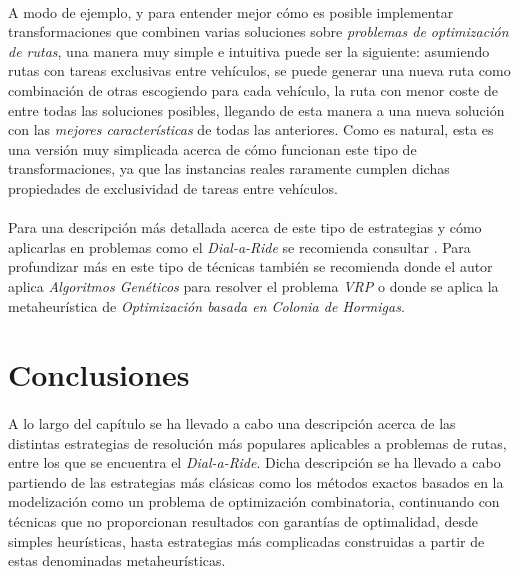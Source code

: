 \documentclass{subfiles}
\begin{document}
      \paragraph{}
      A modo de ejemplo, y para entender mejor cómo es posible implementar transformaciones que combinen varias soluciones sobre \emph{problemas de optimización de rutas}, una manera muy simple e intuitiva puede ser la siguiente: asumiendo rutas con tareas exclusivas entre vehículos, se puede generar una nueva ruta como combinación de otras escogiendo para cada vehículo, la ruta con menor coste de entre todas las soluciones posibles, llegando de esta manera a una nueva solución con las \emph{mejores características} de todas las anteriores. Como es natural, esta es una versión muy simplicada acerca de cómo funcionan este tipo de transformaciones, ya que las instancias reales raramente cumplen dichas propiedades de exclusividad de tareas entre vehículos.

      \paragraph{}
      Para una descripción más detallada acerca de este tipo de estrategias y cómo aplicarlas en problemas como el \emph{Dial-a-Ride} se recomienda consultar \cite{jorgensen2007solving}. Para profundizar más en este tipo de técnicas también se recomienda \cite{baker2003genetic} donde el autor aplica \emph{Algoritmos Genéticos} para resolver el problema \emph{VRP} o \cite{bell2004ant} donde se aplica la metaheurística de \emph{Optimización basada en Colonia de Hormigas}.

    \section{Conclusiones}
    \label{sec:solving_conclusions}

      \paragraph{}
      A lo largo del capítulo se ha llevado a cabo una descripción acerca de las distintas estrategias de resolución más populares aplicables a problemas de rutas, entre los que se encuentra el \emph{Dial-a-Ride}. Dicha descripción se ha llevado a cabo partiendo de las estrategias más clásicas como los métodos exactos basados en la modelización como un problema de optimización combinatoria, continuando con técnicas que no proporcionan resultados con garantías de optimalidad, desde simples heurísticas, hasta estrategias más complicadas construidas a partir de estas denominadas metaheurísticas.
\end{document}
